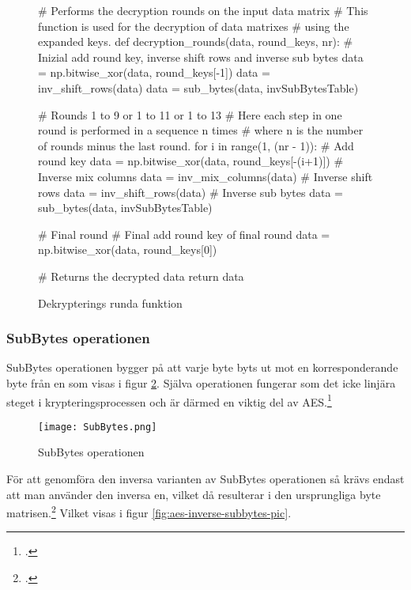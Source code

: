 \begin{figure}[H]
    \centering
    \begin{python}
    # Performs the decryption rounds on the input data matrix
    # This function is used for the decryption of data matrixes
    # using the expanded keys.
    def decryption_rounds(data, round_keys, nr):
        # Inizial add round key, inverse shift rows and inverse sub bytes
        data = np.bitwise_xor(data, round_keys[-1])
        data = inv_shift_rows(data)
        data = sub_bytes(data, invSubBytesTable)

        # Rounds 1 to 9 or 1 to 11 or 1 to 13
        # Here each step in one round is performed in a sequence n times
        # where n is the number of rounds minus the last round.
        for i in range(1, (nr - 1)):
            # Add round key
            data = np.bitwise_xor(data, round_keys[-(i+1)])
            # Inverse mix columns
            data = inv_mix_columns(data)
            # Inverse shift rows
            data = inv_shift_rows(data)
            # Inverse sub bytes
            data = sub_bytes(data, invSubBytesTable)

        # Final round
        # Final add round key of final round
        data = np.bitwise_xor(data, round_keys[0])

        # Returns the decrypted data
        return data

    \end{python}
    \caption{Dekrypterings runda funktion}
    \label{fig:decryption-rounds-function}
\end{figure}

\subsubsection{SubBytes operationen} %
\label{sec:aes-subbytes}
SubBytes operationen bygger på att varje byte byts ut mot en korresponderande \gls{byte} från en  som
visas i figur \ref{fig:aes-subbytes-pic}.
Själva operationen fungerar som det icke linjära steget i krypteringsprocessen och är därmed en viktig del av AES.\footcite{daemen1999aes}

\begin{figure}[H]
    \centering
    \texttt{[image: SubBytes.png]}
    \caption{SubBytes operationen}
    \label{fig:aes-subbytes-pic}
\end{figure}

För att genomföra den inversa varianten av SubBytes operationen så krävs endast att man använder den inversa en,
vilket då resulterar i den ursprungliga \gls{byte} matrisen.\footcite{daemen1999aes} Vilket visas i figur \ref{fig:aes-inverse-subbytes-pic}.

